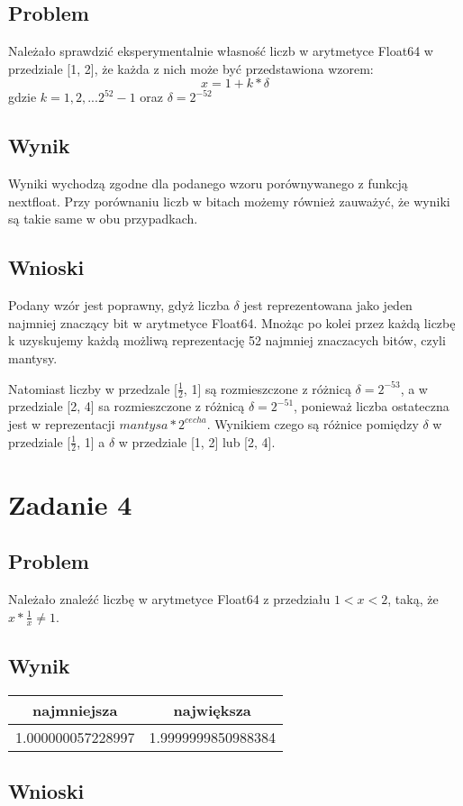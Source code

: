 \documentclass[12pt, a4paper]{article}
\begin{document}
\subsection{Problem}
Należało sprawdzić eksperymentalnie własność liczb w arytmetyce Float64 w przedziale [1, 2], że każda z nich może być przedstawiona wzorem:
\[x =1 + k * \delta \] gdzie $k = 1, 2, ... 2^{52}-1$ oraz $\delta = 2^{-52}$
\subsection{Wynik}
Wyniki wychodzą zgodne dla podanego wzoru porównywanego z funkcją nextfloat. Przy porównaniu liczb w bitach możemy również zauważyć, że wyniki są takie same w obu przypadkach.
\subsection{Wnioski}
Podany wzór jest poprawny, gdyż liczba $\delta$ jest reprezentowana jako jeden najmniej znaczący bit w arytmetyce Float64. Mnożąc po kolei przez każdą liczbę k uzyskujemy każdą możliwą reprezentację 52 najmniej znaczacych bitów, czyli mantysy.

Natomiast liczby w przedzale [$\frac{1}{2}$, 1] są rozmieszczone z różnicą $\delta = 2^{-53}$, a w przedziale [2, 4] sa rozmieszczone z różnicą $\delta = 2^{-51}$, ponieważ liczba ostateczna jest w reprezentacji $mantysa*2^{cecha}$. Wynikiem czego są różnice pomiędzy $\delta$ w przedziale [$\frac{1}{2}$, 1] a $\delta$ w przedziale [1, 2] lub [2, 4].
\section{Zadanie 4}
\subsection{Problem}
Należało znaleźć liczbę w arytmetyce Float64 z przedziału $1 < x < 2$, taką, że $x * \frac{1}{x} \neq 1$.
\subsection{Wynik}
\begin{center}
  \begin{tabular}{c|c}
    najmniejsza & największa\\
    \hline
    1.000000057228997 & 1.9999999850988384
  \end{tabular}
\end{center}
\subsection{Wnioski}
\end{document}
